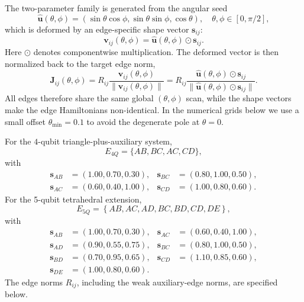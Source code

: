\documentclass[aps,physrev,preprint,groupedaddress]{revtex4-2}
\begin{document}
The two-parameter family is generated from the angular seed
\begin{equation}
    \hat{\mathbf{u}}(\theta,\phi)=(\sin\theta\cos\phi, \sin\theta\sin\phi, \cos\theta), \quad \theta,\phi\in[0,\pi/2],
\end{equation}
which is deformed by an edge-specific shape vector $\mathbf{s}_{ij}$:
\begin{equation}
    \mathbf{v}_{ij}(\theta,\phi) = \hat{\mathbf{u}}(\theta,\phi)\odot \mathbf{s}_{ij}.
\end{equation}
Here $\odot$ denotes componentwise multiplication. The deformed vector is then normalized back to the target edge norm,
\begin{equation}
    \mathbf{J}_{ij}(\theta,\phi) = R_{ij}\frac{\mathbf v_{ij}(\theta,\phi)}{\lVert\mathbf v_{ij}(\theta,\phi)\rVert}
    =R_{ij}\frac{\hat{\mathbf u}(\theta,\phi)\odot \mathbf{s}_{ij}}{
    \lVert\hat{\mathbf u}(\theta,\phi)\odot \mathbf{s}_{ij}\rVert} .
\end{equation}
All edges therefore share the same global $(\theta,\phi)$ scan, while the shape vectors make the edge Hamiltonians non-identical. In the numerical grids below we use a small offset
$\theta_{\min}=0.1$ to avoid the degenerate pole at $\theta=0$.

For the $4$-qubit triangle-plus-auxiliary system,
\begin{equation}
    E_{4Q}=\{AB,BC,AC,CD\},
\end{equation}
with
\begin{align}
    \mathbf s_{AB}&=(1.00,0.70,0.30),&
    \mathbf s_{BC}&=(0.80,1.00,0.50),\\
    \mathbf s_{AC}&=(0.60,0.40,1.00),&
    \mathbf s_{CD}&=(1.00,0.80,0.60).
\end{align}
For the 5-qubit tetrahedral extension,
\begin{equation}
    E_{5Q}=\left\{AB,AC,AD,BC,BD,CD,DE\right\},
\end{equation}
with
\begin{align}
    \mathbf s_{AB}&=(1.00,0.70,0.30),&
    \mathbf s_{AC}&=(0.60,0.40,1.00),\\
    \mathbf s_{AD}&=(0.90,0.55,0.75),&
    \mathbf s_{BC}&=(0.80,1.00,0.50),\\
    \mathbf s_{BD}&=(0.70,0.95,0.65),&
    \mathbf s_{CD}&=(1.10,0.85,0.60),\\
    \mathbf s_{DE}&=(1.00,0.80,0.60).
\end{align}
The edge norms $R_{ij}$, including the weak auxiliary-edge norms, are specified below.
\end{document}
